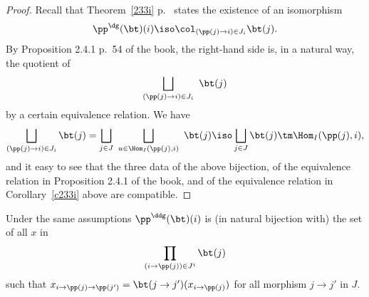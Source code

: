 \documentclass[12pt]{article}
\theoremstyle{remark}
\theoremstyle{definition}
\begin{document}
\begin{proof}
Recall that Theorem~\ref{233i} p.~ states the existence of an isomorphism 
$$
\pp^\dg(\bt)(i)\iso\col_{(\pp(j)\to i)\in J_i}\bt(j).
$$
By Proposition 2.4.1 p.~54 of the book, the right-hand side is, in a natural way, the quotient of 
$$
\bigsqcup_{(\pp(j)\to i)\in J_i}\ \bt(j)
$$ 
by a certain equivalence relation. We have 
$$
\bigsqcup_{(\pp(j)\to i)\in J_i}\bt(j)=\bigsqcup_{j\in J}\ \bigsqcup_{u\in\Hom_I(\pp(j),i)}\ \bt(j)\iso\bigsqcup_{j\in J}\bt(j)\tm\Hom_I(\pp(j),i),
$$ 
and it easy to see that the three data of the above bijection, of the equivalence relation in Proposition 2.4.1 of the book, and of the equivalence relation in Corollary~\ref{c233i} above are compatible.
\end{proof}

Under the same assumptions $\pp^\ddg(\bt)(i)$ is (in natural bijection with) the set of all $x$ in 
$$
\prod_{(i\to\pp(j))\in J^i}\bt(j)
$$ 
such that $x_{i\to\pp(j)\to\pp(j')}=\bt(j\to j')(x_{i\to\pp(j)})$ for all morphism $j\to j'$ in $J$.


\end{document}
